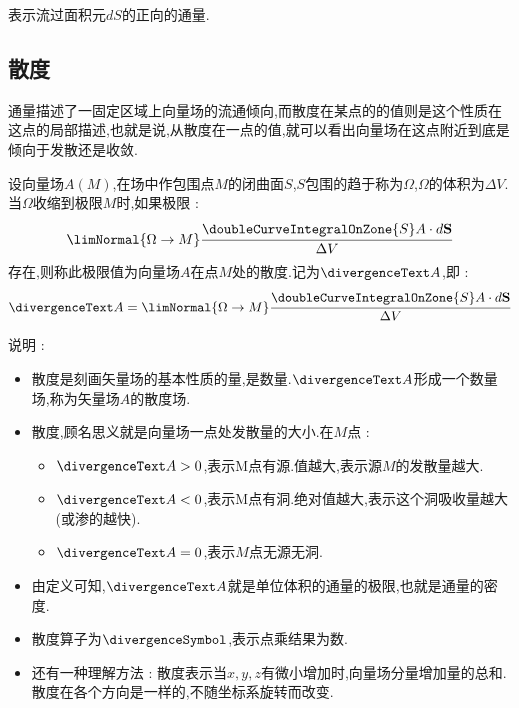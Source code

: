 {{{{\begin{itemize}
{              表示流过面积元$dS$的正向的通量.
              }
      \end{itemize}
    }%

    \subsection{散度}{
      通量描述了一固定区域上向量场的流通倾向,而散度在某点的的值则是这个性质在这点的局部描述,也就是说,从散度在一点的值,就可以看出向量场在这点附近到底是倾向于发散还是收敛.

      设向量场$A(M)$,在场中作包围点$M$的闭曲面$S$,$S$包围的趋于称为$\Omega$,$\Omega$的体积为$\Delta V$.当$\Omega$收缩到极限$M$时,如果极限 :
      $$
        \limNormal{\Omega \to M}\cfrac{\doubleCurveIntegralOnZone{S}A \cdot d\mathbf{S}}{\Delta V}
      $$
      存在,则称此极限值为向量场$A$在点$M$处的散度.记为$\divergenceText A$,即 :
      $$
        \divergenceText A = \limNormal{\Omega \to M}\cfrac{\doubleCurveIntegralOnZone{S}A \cdot d\mathbf{S}}{\Delta V}
      $$

      说明 :
      \begin{itemize}
        \item {
              散度是刻画矢量场的基本性质的量,是数量.$\divergenceText A$形成一个数量场,称为矢量场$A$的散度场.
              }
        \item {
              散度,顾名思义就是向量场一点处发散量的大小.在$M$点 :
              \begin{itemize}
                \item $\divergenceText A > 0$,表示M点有源.值越大,表示源$M$的发散量越大.
                \item $\divergenceText A < 0$,表示M点有洞.绝对值越大,表示这个洞吸收量越大(或渗的越快).
                \item $\divergenceText A = 0$,表示$M$点无源无洞.
              \end{itemize}
              }
        \item {
              由定义可知,$\divergenceText A$就是单位体积的通量的极限,也就是通量的密度.
              }
        \item {
              散度算子为$\divergenceSymbol$,表示点乘结果为数.
              }
        \item {
              还有一种理解方法 : 散度表示当$x,y,z$有微小增加时,向量场分量增加量的总和.散度在各个方向是一样的,不随坐标系旋转而改变.
              }
      \end{itemize}
    }%

}}}
